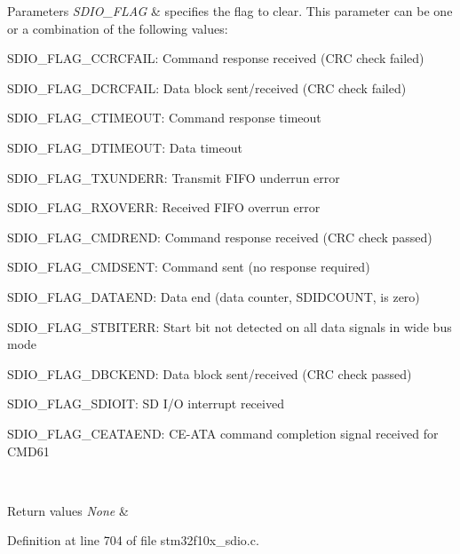\begin{DoxyParams}{Parameters}
{\em S\+D\+I\+O\+\_\+\+F\+L\+AG} & specifies the flag to clear. This parameter can be one or a combination of the following values\+: \begin{DoxyItemize}
\item S\+D\+I\+O\+\_\+\+F\+L\+A\+G\+\_\+\+C\+C\+R\+C\+F\+A\+IL\+: Command response received (C\+RC check failed) \item S\+D\+I\+O\+\_\+\+F\+L\+A\+G\+\_\+\+D\+C\+R\+C\+F\+A\+IL\+: Data block sent/received (C\+RC check failed) \item S\+D\+I\+O\+\_\+\+F\+L\+A\+G\+\_\+\+C\+T\+I\+M\+E\+O\+UT\+: Command response timeout \item S\+D\+I\+O\+\_\+\+F\+L\+A\+G\+\_\+\+D\+T\+I\+M\+E\+O\+UT\+: Data timeout \item S\+D\+I\+O\+\_\+\+F\+L\+A\+G\+\_\+\+T\+X\+U\+N\+D\+E\+RR\+: Transmit F\+I\+FO underrun error \item S\+D\+I\+O\+\_\+\+F\+L\+A\+G\+\_\+\+R\+X\+O\+V\+E\+RR\+: Received F\+I\+FO overrun error \item S\+D\+I\+O\+\_\+\+F\+L\+A\+G\+\_\+\+C\+M\+D\+R\+E\+ND\+: Command response received (C\+RC check passed) \item S\+D\+I\+O\+\_\+\+F\+L\+A\+G\+\_\+\+C\+M\+D\+S\+E\+NT\+: Command sent (no response required) \item S\+D\+I\+O\+\_\+\+F\+L\+A\+G\+\_\+\+D\+A\+T\+A\+E\+ND\+: Data end (data counter, S\+D\+I\+D\+C\+O\+U\+NT, is zero) \item S\+D\+I\+O\+\_\+\+F\+L\+A\+G\+\_\+\+S\+T\+B\+I\+T\+E\+RR\+: Start bit not detected on all data signals in wide bus mode \item S\+D\+I\+O\+\_\+\+F\+L\+A\+G\+\_\+\+D\+B\+C\+K\+E\+ND\+: Data block sent/received (C\+RC check passed) \item S\+D\+I\+O\+\_\+\+F\+L\+A\+G\+\_\+\+S\+D\+I\+O\+IT\+: SD I/O interrupt received \item S\+D\+I\+O\+\_\+\+F\+L\+A\+G\+\_\+\+C\+E\+A\+T\+A\+E\+ND\+: C\+E-\/\+A\+TA command completion signal received for C\+M\+D61 \end{DoxyItemize}
\\
\hline
\end{DoxyParams}

\begin{DoxyRetVals}{Return values}
{\em None} & \\
\hline
\end{DoxyRetVals}


Definition at line 704 of file stm32f10x\+\_\+sdio.\+c.


